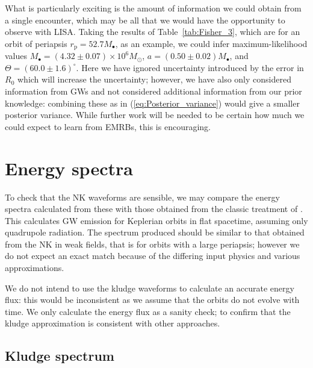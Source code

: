 \documentclass[useAMS,usedcolumn,usegraphicx,usenatbib]{mn2e}
\newcommand{\eqnref}[1]{(\ref{eq:#1})}
\newcommand{\tabref}[1]{Table~\ref{tab:#1}}
\newcommand{\sub}[1]{\ensuremath{_\mathrm{#1}}}
\begin{document}
What is particularly exciting is the amount of information we could obtain from a single encounter, which may be all that we would have the opportunity to observe with LISA. Taking the results of \tabref{Fisher_3}, which are for an orbit of periapsis $r\sub{p} = 52.7 M_\bullet$, as an example, we could infer maximum-likelihood values $M_\bullet = (4.32 \pm 0.07) \times 10^6 M_\odot$, $a = (0.50{} \pm {}0.02) M_\bullet$, and $\Theta = {(60.0 \pm 1.6)^{\circ}}$. Here we have ignored uncertainty introduced by the error in $R_0$ which will increase the uncertainty; however, we have also only considered information from GWs and not considered additional information from our prior knowledge: combining these as in \eqnref{Posterior_variance} would give a smaller posterior variance. While further work will be needed to be certain how much we could expect to learn from EMRBs, this is encouraging.

\section{Energy spectra\label{sec:Energy}}

To check that the NK waveforms are sensible, we may compare the energy spectra calculated from these with those obtained from the classic treatment of \citet{Peters1963, Peters1964}. This calculates GW emission for Keplerian orbits in flat spacetime, assuming only quadrupole radiation. The spectrum produced should be similar to that obtained from the NK in weak fields, that is for orbits with a large periapsis; however we do not expect an exact match because of the differing input physics and various approximations.

We do not intend to use the kludge waveforms to calculate an accurate energy flux: this would be inconsistent as we assume that the orbits do not evolve with time. We only calculate the energy flux as a sanity check; to confirm that the kludge approximation is consistent with other approaches.

\subsection{Kludge spectrum}
\end{document}
